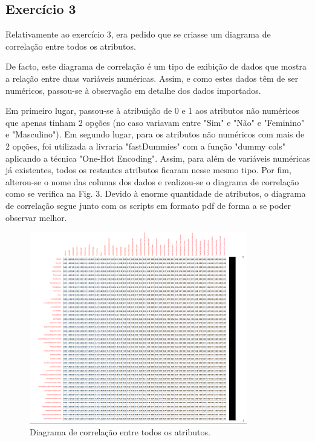 \subsection{Exercício 3}
Relativamente ao exercício 3, era pedido que se criasse um diagrama de correlação entre todos os atributos.

De facto, este diagrama de correlação é um tipo de exibição de dados que mostra a relação entre duas variáveis numéricas. Assim, e como estes dados têm de ser numéricos, passou-se à observação em detalhe dos dados importados.

Em primeiro lugar, passou-se à atribuição de 0 e 1 aos atributos não numéricos que apenas tinham 2 opções (no caso variavam entre "Sim" e "Não" e "Feminino" e "Masculino"). Em segundo lugar, para os atributos não numéricos com mais de 2 opções, foi utilizada a livraria "fastDummies" com a função "dummy cols" aplicando a técnica "One-Hot Encoding". Assim, para além de variáveis numéricas já existentes, todos os restantes atributos ficaram nesse mesmo tipo. Por fim, alterou-se o nome das colunas dos dados e realizou-se o diagrama de correlação como se verifica na Fig. 3. Devido à enorme quantidade de atributos, o diagrama de correlação segue junto com os scripts em formato pdf de forma a se poder observar melhor.

\begin{figure}[htbp]
\centerline{\includegraphics[width=9.5cm]{images/ex3_diagrama_correlacao.png}}
\caption{Diagrama de correlação entre todos os atributos.}
\label{ex3_diagrama_correlacao}
\end{figure}